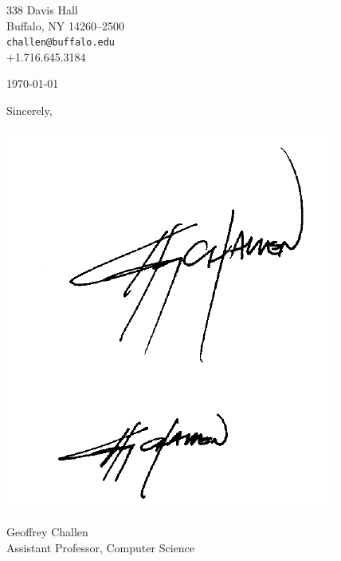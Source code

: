 

\def\shorttitle{}
\def\shortauthors{Geoffrey Challen}


\pagestyle{letter}

338 Davis Hall\\
Buffalo, NY 14260--2500\\
\texttt{challen@buffalo.edu}\\
+1.716.645.3184

\vspace*{0.1in}

\today

\vspace*{0.1in}



\vspace*{0.1in}

Sincerely,


\vspace*{-0.1in}
\includegraphics{./figs/LargeSig.pdf}
\vspace*{-0.1in}


Geoffrey Challen\\
Assistant Professor, Computer Science


